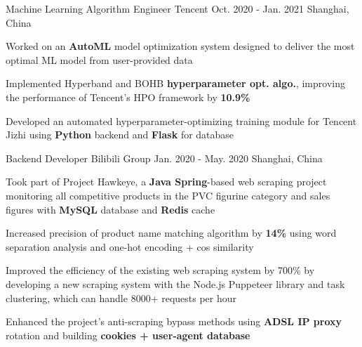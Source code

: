 

\begin{cventries}

  \cventry
    {Machine Learning Algorithm Engineer} %
    {Tencent} %
    {Oct. 2020 - Jan. 2021} %
    {Shanghai, China} %
    {
      \begin{cvitems} %
        \item {Worked on an \textbf{AutoML} model optimization system designed to deliver the most optimal ML model from user-provided data}
        \item {Implemented Hyperband and BOHB \textbf{hyperparameter opt. algo.}, improving the performance of Tencent's HPO framework by \textbf{10.9\%}}
        \item {Developed an automated hyperparameter-optimizing training module for Tencent Jizhi using \textbf{Python} backend and \textbf{Flask} for database}
      \end{cvitems}
    }

  \cventry
    {Backend Developer} %
    {Bilibili Group} %
    {Jan. 2020 - May. 2020} %
    {Shanghai, China} %
    {
      \begin{cvitems} %
        \item {Took part of Project Hawkeye, a \textbf{Java Spring}-based web scraping project monitoring all competitive products in the PVC figurine category and sales figures with \textbf{MySQL} database and \textbf{Redis} cache}
        \item {Increased precision of product name matching algorithm by \textbf{14\%} using word separation analysis and one-hot encoding + cos similarity}
        \item {Improved the efficiency of the existing web scraping system by 700\% by developing a new scraping system with the Node.js Puppeteer library and task clustering, which can handle 8000+ requests per hour}
        \item {Enhanced the project's anti-scraping bypass methods using \textbf{ADSL IP proxy} rotation and building \textbf{cookies + user-agent database}}
      \end{cvitems}
    }


\end{cventries}
